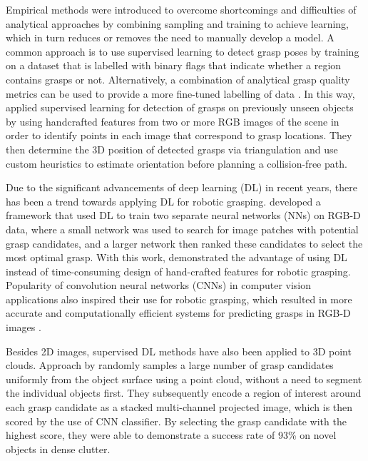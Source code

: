 Empirical methods were introduced to overcome shortcomings and difficulties of analytical approaches by combining sampling and training to achieve learning, which in turn reduces or removes the need to manually develop a model. A common approach is to use supervised learning to detect grasp poses by training on a dataset that is labelled with binary flags that indicate whether a region contains grasps or not. Alternatively, a combination of analytical grasp quality metrics can be used to provide a more fine-tuned labelling of data \cite{roa_grasp_2015}. In this way, \citet{saxena_robotic_2008} applied supervised learning for detection of grasps on previously unseen objects by using handcrafted features from two or more RGB images of the scene in order to identify points in each image that correspond to grasp locations. They then determine the 3D position of detected grasps via triangulation and use custom heuristics to estimate orientation before planning a collision-free path.

Due to the significant advancements of deep learning (DL) in recent years, there has been a trend towards applying DL for robotic grasping. \citet{lenz_deep_2015} developed a framework that used DL to train two separate neural networks (NNs) on RGB-D data, where a small network was used to search for image patches with potential grasp candidates, and a larger network then ranked these candidates to select the most optimal grasp. With this work, \citeauthor{lenz_deep_2015} demonstrated the advantage of using DL instead of time-consuming design of hand-crafted features for robotic grasping. Popularity of convolution neural networks (CNNs) in computer vision applications also inspired their use for robotic grasping, which resulted in more accurate and computationally efficient systems for predicting grasps in RGB-D images \cite{redmon_real-time_2015, kumra_robotic_2017}.

Besides 2D images, supervised DL methods have also been applied to 3D point clouds. Approach by \citet{ten_pas_grasp_2017} randomly samples a large number of grasp candidates uniformly from the object surface using a point cloud, without a need to segment the individual objects first. They subsequently encode a region of interest around each grasp candidate as a stacked multi-channel projected image, which is then scored by the use of CNN classifier. By selecting the grasp candidate with the highest score, they were able to demonstrate a success rate of 93\% on novel objects in dense clutter.


